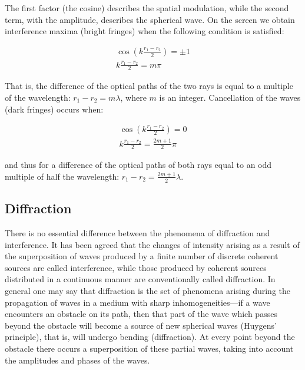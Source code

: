 The first factor (the cosine) describes the spatial modulation, while the second term, with the amplitude, describes the spherical wave. On the screen we obtain interference maxima (bright fringes) when the following condition is satisfied:

\begin{equation}
    \begin{matrix}
        \cos{\left(k\frac{r_{1} - r_{2}}{2}\right)} = \pm 1\\
        k\frac{r_{1} - r_{2}}{2} = m\pi
    \end{matrix}
\end{equation}

That is, the difference of the optical paths of the two rays is equal to a multiple of the wavelength: $r_{1} - r_{2} = m\lambda$, where $m$ is an integer. Cancellation of the waves (dark fringes) occurs when:

\begin{equation}
    \begin{matrix}
        \cos{\left(k\frac{r_{1} - r_{2}}{2}\right)} = 0\\
        k\frac{r_{1} - r_{2}}{2} = \frac{2m+1}{2}\pi
    \end{matrix}
\end{equation}

and thus for a difference of the optical paths of both rays equal to an odd multiple of half the wavelength: $r_{1} - r_{2} = \frac{2m+1}{2}\lambda$.

\subsection{Diffraction}

There is no essential difference between the phenomena of diffraction and interference. It has been agreed that the changes of intensity arising as a result of the superposition of waves produced by a finite number of discrete coherent sources are called interference, while those produced by coherent sources distributed in a continuous manner are conventionally called diffraction. In general one may say that diffraction is the set of phenomena arising during the propagation of waves in a medium with sharp inhomogeneities---if a wave encounters an obstacle on its path, then that part of the wave which passes beyond the obstacle will become a source of new spherical waves (Huygens' principle), that is, will undergo bending (diffraction). At every point beyond the obstacle there occurs a superposition of these partial waves, taking into account the amplitudes and phases of the waves.

